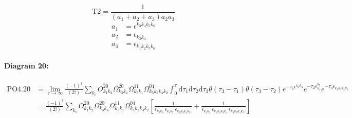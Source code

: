 \documentclass[10pt,a4paper]{article}
\begin{document}
\begin{equation}
\text{T}2 = \frac{1}{(a_1+ a_2+ a_3)a_2a_3}\end{equation}
\begin{align*}
a_1 &= \epsilon^{k_{3}k_{4}k_{5}k_{6}}_{}\\
a_2 &= \epsilon^{}_{k_{3}k_{4}}\\
a_3 &= \epsilon^{}_{k_{1}k_{2}k_{5}k_{6}}
\end{align*}
\paragraph{Diagram 20:}
\begin{align}
\text{PO}4.20
&= \lim\limits_{\tau \to \infty}\frac{(-1)^3 }{(2!)}\sum_{k_i}O^{20}_{k_{1}k_{2}} \Omega^{20}_{k_{3}k_{4}} \Omega^{11}_{k_{5}k_{1}} \Omega^{04}_{k_{5}k_{3}k_{4}k_{2}} \int_{0}^{\tau}\mathrm{d}\tau_1\mathrm{d}\tau_2\mathrm{d}\tau_3\theta(\tau_3-\tau_1) \theta(\tau_3-\tau_2) e^{-\tau_1 \epsilon^{k_{3}k_{4}}_{}}e^{-\tau_2 \epsilon^{k_{5}}_{k_{1}}}e^{-\tau_3 \epsilon^{}_{k_{2}k_{3}k_{4}k_{5}}}
 \nonumber \\
&= \frac{(-1)^3 }{(2!)}\sum_{k_i}O^{20}_{k_{1}k_{2}} \Omega^{20}_{k_{3}k_{4}} \Omega^{11}_{k_{5}k_{1}} \Omega^{04}_{k_{5}k_{3}k_{4}k_{2}} \left[\frac{1}{\epsilon^{}_{k_{2}k_{5}}\ \epsilon^{}_{k_{1}k_{2}}\ \epsilon^{}_{k_{2}k_{3}k_{4}k_{5}}\ } + \frac{1}{\epsilon^{}_{k_{1}k_{2}}\ \epsilon^{}_{k_{1}k_{2}k_{3}k_{4}}\ \epsilon^{}_{k_{2}k_{3}k_{4}k_{5}}\ } \right]
\end{align}
\end{document}
